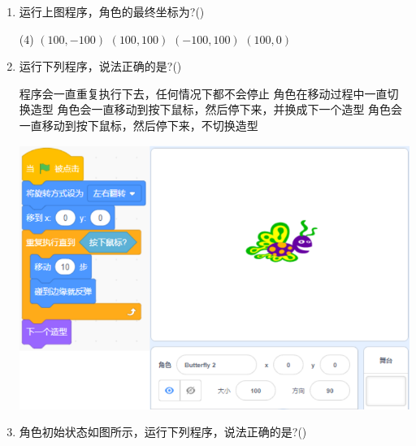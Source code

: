 \documentclass[10pt, a4paper]{article}
\begin{document}
\begin{enumerate}
        \item 运行上图程序，角色的最终坐标为?(\qquad)
        \begin{tasks}(4)
            \task $(100,-100)$
            \task $(100,100)$
            \task $(-100,100)$
            \task $(100,0)$
        \end{tasks}

        \item 运行下列程序，说法正确的是?(\qquad)
        
        \begin{minipage}{.6\textwidth}
            \begin{tasks}
                \task 程序会一直重复执行下去，任何情况下都不会停止
                \task 角色在移动过程中一直切换造型
                \task 角色会一直移动到按下鼠标，然后停下来，并换成下一个造型
                \task 角色会一直移动到按下鼠标，然后停下来，不切换造型
            \end{tasks}
        \end{minipage}
        \begin{minipage}{.3\textwidth}
            \includegraphics[width=\textwidth]{10.png}
        \end{minipage}
        
        \item 角色初始状态如图所示，运行下列程序，说法正确的是?(\qquad)
        

\end{enumerate}
\end{document}
